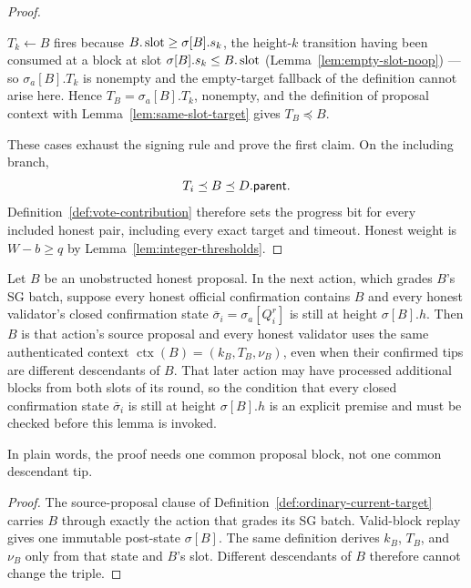 \begin{proof}
\begin{enumerate}
   \(T_k\gets B\) fires because \(B.\operatorname{\mathrm{slot}}\geq\sigma[B].s_k\), the
   height-\(k\) transition having been consumed at a block at slot
   \(\sigma[B].s_k\leq B.\operatorname{\mathrm{slot}}\) (Lemma~\ref{lem:empty-slot-noop}) ---
   so \(\sigma_a[B].T_k\) is nonempty and the empty-target fallback of
   the definition cannot arise here.
   Hence \(T_B=\sigma_a[B].T_k\), nonempty,
   and the definition of proposal context with
   Lemma~\ref{lem:same-slot-target} gives \(T_B\preceq B\).
\end{enumerate}
These cases exhaust the signing rule and prove the first claim.  On the
including branch,
\[
 T_i\preceq B\preceq D.\mathsf{parent} .
\]
Definition~\ref{def:vote-contribution} therefore sets the progress bit for
every included honest pair, including every exact target and timeout.
Honest weight is \(W-b\geq q\) by
Lemma~\ref{lem:integer-thresholds}.
\end{proof}

\begin{lemma}
\label{lem:usable-common-action}
Let \(B\) be an unobstructed honest proposal.  In the next action, which
grades \(B\)'s SG batch, suppose every honest official confirmation contains
\(B\) and every honest validator's closed confirmation state
\(\bar\sigma_i=\sigma_a[Q_i^r]\) is
still at height \(\sigma[B].h\).  Then \(B\)
is that action's source proposal and every honest
validator uses the same authenticated context
\(\operatorname{ctx}(B)=(k_B,T_B,\nu_B)\), even when their confirmed tips are
different descendants of \(B\).  That later action may have processed
additional blocks from both slots of its round, so the condition that every
closed confirmation state \(\bar\sigma_i\) is still at height \(\sigma[B].h\) is an explicit
premise and must be
checked before this lemma is invoked.

In plain words, the proof needs one common proposal block, not one common
descendant tip.
\end{lemma}

\begin{proof}
The source-proposal clause of
Definition~\ref{def:ordinary-current-target} carries \(B\) through exactly
the action that grades its SG batch.  Valid-block replay gives one immutable
post-state \(\sigma[B]\).  The same definition derives \(k_B\), \(T_B\), and
\(\nu_B\) only from that state and \(B\)'s slot.  Different descendants of
\(B\) therefore cannot change the triple.
\end{proof}

